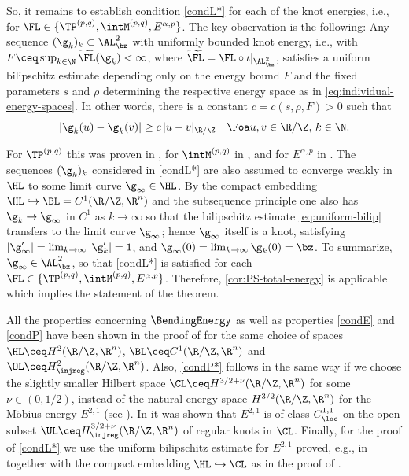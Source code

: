 \begin{refproof}
So, it remains to establish condition
\ref{condL*} for each of the knot energies, i.e., for $\FL\in\{\TP^{(p,q)},
\intM^{(p,q)},E^{\alpha,p}\}$. The key observation is the following: Any sequence
$(\g_k)_k\subset\AL^2_\bz$
with uniformly bounded knot energy, i.e., with $F\ceq\sup_{k\in\N}
\widetilde{\FL}(\g_k)
<\infty$, where $\widetilde{\FL}=\FL\circ\iota|_{\AL^2_\bz}$, satisfies a uniform bilipschitz
estimate depending only on the energy bound $F$ and the fixed  parameters
$s$ and $\rho$ determining the respective energy space as in 
\cref{eq:individual-energy-spaces}. In other words, there is a
constant $c=c(s,\rho,F)>0$ such that 
\begin{equation}\label{eq:uniform-bilip}
|\g_k(u)-\g_k(v)|\ge  c \,|u-v|_{\R/\Z}\quad\Foa u,v\in\R/\Z,\,k\in\N.
\end{equation}

For $\TP^{(p,q)}$ this was proven in \cite[Proposition 2.7]{blatt-reiter_2015a},
for $\intM^{(p,q)}$ in \cite[Proposition 2.1]{blatt-reiter_2015b}, and for
$E^{\alpha,p}$ in \cite[Proof of Theorem 1.1, pp. 21-22]{matt-etal_2023}.
The sequences $(\g_k)_k$
considered  in \ref{condL*} are also assumed to converge weakly in $\HL$
to some limit curve $\g_\infty\in\HL$.
By the compact embedding $\HL\hookrightarrow \BL=C^1(\R/\Z,\R^n)$ and the subsequence principle
one also has $\g_k\to\g_\infty$ in $C^1$ as $k\to\infty$ so that the bilipschitz
estimate \cref{eq:uniform-bilip} transfers to the limit curve $\g_\infty$; 
hence
$\g_\infty$ itself is a knot, satisfying $|\g_\infty'|=\lim_{k\to\infty}|\g_k'|=1$, and
$\g_\infty(0)=\lim_{k\to\infty}\g_k(0)=\bz$. To summarize,
$\g_\infty\in \AL^2_\bz$, so that \ref{condL*} is satisfied for
each $\FL\in\{\TP^{(p,q)},
\intM^{(p,q)},E^{\alpha,p}\}$. Therefore, \cref{cor:PS-total-energy} is applicable which implies the statement of the theorem.
\end{refproof}

\begin{refproof}
All the properties concerning  $\BendingEnergy$ as well as properties
\ref{condE} and \ref{condP} have been shown in the proof of
 for the same choice of spaces
$\HL \ceq H^2(\R/\Z,\R^n)$, $\BL \ceq C^1(\R/\Z,\R^n)$ and $\OL\ceq
H^2_\injreg(\R/\Z,\R^n)$. Also, \ref{condP*} follows in the same way if
we choose the slightly smaller Hilbert space $\CL \ceq H^{3/2 +\nu}(\R/\Z,\R^n)$
for some $\nu\in (0,1/2)$,
instead of the natural energy space $H^{3/2}(\R/\Z,\R^n)$ for the
M\"obius energy $E^{2,1}$ (see \cite[Theorem 1.1]{blatt_2012a}).
In \cite[Theorem 3.1]{reiter-schumacher_2021} it was shown that 
$E^{2,1}$ is of class $C^{1,1}_\loc$ on the open subset
$\UL \ceq H^{3/2 +\nu}_\injreg(\R/\Z,\R^n)$ of regular knots in $\CL$.
Finally, for the proof of \ref{condL*} we use the uniform
bilipschitz estimate for $E^{2,1}$ proved, e.g., in 
\cite[Lemma 3.1]{gilsbach-vdm_2018} 
together with the compact embedding $\HL\hookrightarrow\CL$ as
in the proof of .
\end{refproof}

